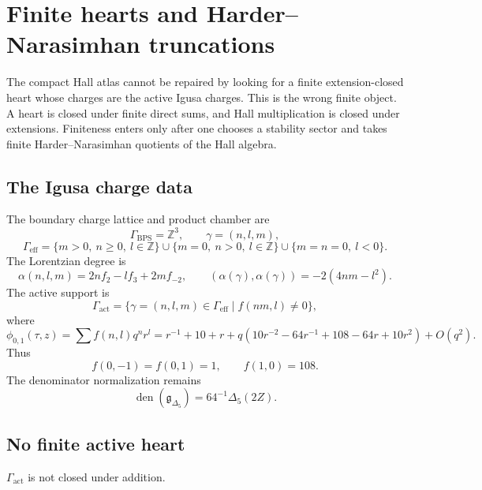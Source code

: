 \section{Finite hearts and Harder--Narasimhan truncations}
\label{sec:compact-hall-finite-heart-and-hn}

\providecommand{\Z}{\mathbb Z}
\providecommand{\R}{\mathbb R}
\providecommand{\C}{\mathbb C}
\providecommand{\GammaBPS}{\Gamma_{\mathrm{BPS}}}
\providecommand{\Gammaeff}{\Gamma_{\mathrm{eff}}}
\providecommand{\Gammaact}{\Gamma_{\mathrm{act}}}
\providecommand{\Hall}{\mathcal H}
\providecommand{\Perf}{\operatorname{Perf}}
\providecommand{\Coh}{\operatorname{Coh}}
\providecommand{\Prim}{\operatorname{Prim}}
\providecommand{\sdim}{\operatorname{sdim}}

The compact Hall atlas cannot be repaired by looking for a finite
extension-closed heart whose charges are the active Igusa charges.  This
is the wrong finite object.  A heart is closed under finite direct sums,
and Hall multiplication is closed under extensions.  Finiteness enters
only after one chooses a stability sector and takes finite
Harder--Narasimhan quotients of the Hall algebra.

\subsection{The Igusa charge data}

The boundary charge lattice and product chamber are
\[
  \GammaBPS=\Z^3,\qquad \gamma=(n,l,m),
\]
\[
  \Gammaeff=
  \{m>0,\ n\ge0,\ l\in\Z\}
  \cup
  \{m=0,\ n>0,\ l\in\Z\}
  \cup
  \{m=n=0,\ l<0\}.
\]
The Lorentzian degree is
\[
  \alpha(n,l,m)=2n f_2-l f_3+2m f_{-2},
  \qquad
  (\alpha(\gamma),\alpha(\gamma))=-2(4nm-l^2).
\]
The active support is
\[
  \Gammaact=
  \{\gamma=(n,l,m)\in\Gammaeff\mid f(nm,l)\ne0\},
\]
where
\[
  \phi_{0,1}(\tau,z)=\sum f(n,l)q^n r^l
  =
  r^{-1}+10+r
  +q(10r^{-2}-64r^{-1}+108-64r+10r^2)+O(q^2).
\]
Thus
\[
  f(0,-1)=f(0,1)=1,\qquad f(1,0)=108.
\]
The denominator normalization remains
\[
  \operatorname{den}(\mathfrak g_{\Delta_5})
  =
  64^{-1}\Delta_5(2Z).
\]

\subsection{No finite active heart}

\begin{lemma}
\label{lem:active-support-not-additive}
\(\Gammaact\) is not closed under addition.
\end{lemma}

